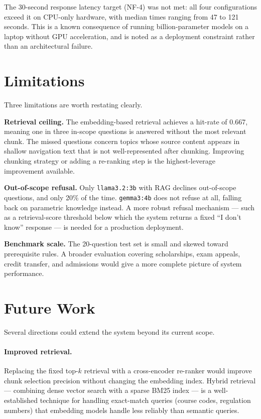 The 30-second response latency target (NF-4) was not met: all four configurations exceed it on CPU-only hardware, with median times ranging from 47 to 121 seconds. This is a known consequence of running billion-parameter models on a laptop without GPU acceleration, and is noted as a deployment constraint rather than an architectural failure.

\section{Limitations}
\label{sec:sum-limitations}

Three limitations are worth restating clearly.

\textbf{Retrieval ceiling.} The embedding-based retrieval achieves a hit-rate of 0.667, meaning one in three in-scope questions is answered without the most relevant chunk. The missed questions concern topics whose source content appears in shallow navigation text that is not well-represented after chunking. Improving chunking strategy or adding a re-ranking step is the highest-leverage improvement available.

\textbf{Out-of-scope refusal.} Only \texttt{llama3.2:3b} with RAG declines out-of-scope questions, and only 20\% of the time. \texttt{gemma3:4b} does not refuse at all, falling back on parametric knowledge instead. A more robust refusal mechanism — such as a retrieval-score threshold below which the system returns a fixed ``I don't know'' response — is needed for a production deployment.

\textbf{Benchmark scale.} The 20-question test set is small and skewed toward prerequisite rules. A broader evaluation covering scholarships, exam appeals, credit transfer, and admissions would give a more complete picture of system performance.

\section{Future Work}
\label{sec:sum-future}

Several directions could extend the system beyond its current scope.

\paragraph{Improved retrieval.}
Replacing the fixed top-$k$ retrieval with a cross-encoder re-ranker would improve chunk selection precision without changing the embedding index. Hybrid retrieval — combining dense vector search with a sparse BM25 index — is a well-established technique for handling exact-match queries (course codes, regulation numbers) that embedding models handle less reliably than semantic queries.

